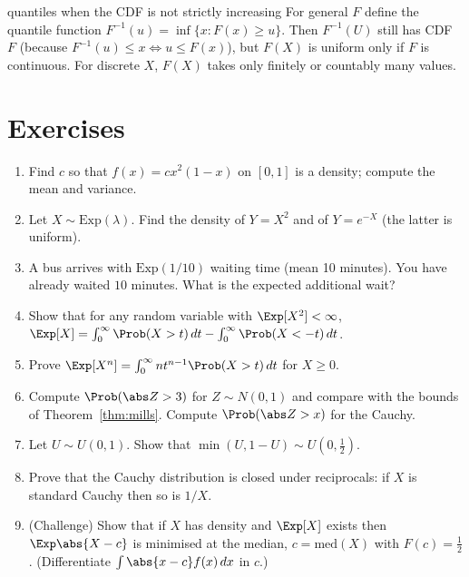 \begin{nuance}{quantiles when the CDF is not strictly increasing}
For general $F$ define the quantile function $F^{-1}(u)=\inf\{x:F(x)\ge u\}$. Then
$F^{-1}(U)$ still has CDF $F$ (because $F^{-1}(u)\le x\iff u\le F(x)$), but
$F(X)$ is uniform only if $F$ is continuous. For discrete $X$, $F(X)$ takes only
finitely or countably many values.
\end{nuance}

\section*{Exercises}

\begin{enumerate}
\item Find $c$ so that $f(x)=cx^2(1-x)$ on $[0,1]$ is a density; compute the mean and
variance.
\item Let $X\sim\mathrm{Exp}(\lambda)$. Find the density of $Y=X^2$ and of
$Y=e^{-X}$ (the latter is uniform).
\item A bus arrives with $\mathrm{Exp}(1/10)$ waiting time (mean 10 minutes). You
have already waited $10$ minutes. What is the expected additional wait?
\item Show that for any random variable with $\Exp[X^2]<\infty$,
$\Exp[X]=\int_0^\infty\Prob(X>t)\,dt-\int_0^\infty\Prob(X<-t)\,dt$.
\item Prove $\Exp[X^n]=\int_0^\infty nt^{n-1}\Prob(X>t)\,dt$ for $X\ge0$.
\item Compute $\Prob(\abs Z>3)$ for $Z\sim N(0,1)$ and compare with the bounds of
Theorem~\ref{thm:mills}. Compute $\Prob(\abs Z>x)$ for the Cauchy.
\item Let $U\sim U(0,1)$. Show that $\min(U,1-U)\sim U(0,\tfrac12)$.
\item Prove that the Cauchy distribution is closed under reciprocals:
if $X$ is standard Cauchy then so is $1/X$.
\item (Challenge) Show that if $X$ has density and $\Exp[X]$ exists then
$\Exp\abs{X-c}$ is minimised at the median, $c=\mathrm{med}(X)$ with
$F(c)=\tfrac12$. (Differentiate $\int\abs{x-c}f(x)\,dx$ in $c$.)
\end{enumerate}
